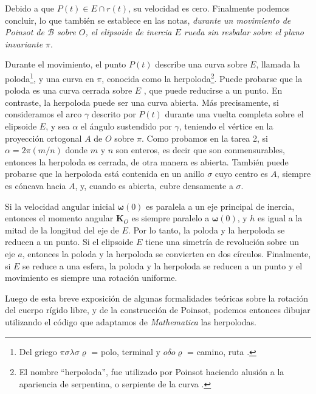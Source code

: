 \documentclass[a4paper,10pt]{article}
\numberwithin{equation}{section}
\begin{document}
\vspace{.3cm}

Debido a que $P(t) \in E \cap r(t)$, su velocidad es cero. Finalmente podemos concluir, 
lo que también se establece en las notas, \emph{durante un movimiento de Poinsot de $\mathcal{B}$
sobre $O$, el elipsoide de inercia $E$ rueda sin resbalar sobre el plano invariante $\pi$}.

\vspace{.3cm}

Durante el movimiento, el punto $P(t)$ describe una curva sobre $E$, llamada la poloda\footnote{
Del griego $\pi\sigma\lambda\sigma\varrho$ = polo, terminal y $o\delta o \varrho$ = camino, ruta \cite{spivak}.}, y 
una curva en $\pi$, conocida como la herpoloda\footnote{El nombre ``herpoloda'',
fue utilizado por Poinsot haciendo alusión a la apariencia de serpentina,
o serpiente de la curva \cite{spivak}.}. Puede probarse que 
la poloda es una curva cerrada sobre $E$ \cite{whittaker}, que puede reducirse 
a un punto. En contraste, la herpoloda puede ser una curva abierta. Más 
precisamente, si consideramos el arco $\gamma$ descrito por $P(t)$ durante 
una vuelta completa sobre el elipsoide $E$, y sea $\alpha$ el ángulo sustendido 
por $\gamma$, teniendo el vértice en la proyección ortogonal $A$ de $O$ sobre 
$\pi$. Como probamos en la tarea 2, si $\alpha = 2\pi(m/n)$ donde $m$ y $n$
son enteros, es decir que son conmensurables, entonces la herpoloda es 
cerrada, de otra manera es abierta. También puede probarse que la herpoloda está
contenida en un anillo $\sigma$ cuyo centro es $A$, siempre es cóncava hacia 
$A$, y, cuando es abierta, cubre densamente a $\sigma$. 

\vspace{.3cm}

Si la velocidad angular inicial $\mathbf{\omega}(0)$ es paralela a un eje
principal de inercia, entonces el momento angular $\mathbf{K}_O$ es siempre paralelo 
a $\mathbf{\omega}(0)$, y $h$ es igual a la mitad de la longitud del eje 
de $E$. Por lo tanto, la poloda y la herpoloda se reducen a un punto. Si el
elipsoide $E$ tiene una simetría de revolución sobre un eje $a$, entonces 
la poloda y la herpoloda se convierten en dos círculos. Finalmente, si 
$E$ se reduce a una esfera, la poloda y la herpoloda se reducen a un 
punto y el movimiento es siempre una rotación uniforme.

\vspace{.3cm}

Luego de esta breve exposición de algunas formalidades teóricas sobre la rotación
del cuerpo rígido libre, y de la construcción de Poinsot, podemos entonces 
dibujar utilizando el código que adaptamos de \emph{Mathematica} las herpolodas.
\end{document}

